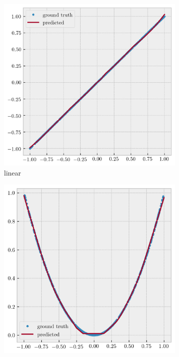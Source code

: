 \documentclass[12pt,a4paper]{article}
\begin{document}
\begin{figure}[htb]
	\centering
	\begin{subfigure}[h!]{0.3\textwidth}
		\centering
		\includegraphics[width=\textwidth]{fit-1-pred.png}
		\caption{linear}
		\label{fig:linear}
	\end{subfigure}
	\begin{subfigure}[h!]{0.3\textwidth}
		\centering
		\includegraphics[width=\textwidth]{fit-2-pred.png}

\end{subfigure}
\end{figure}
\end{document}
